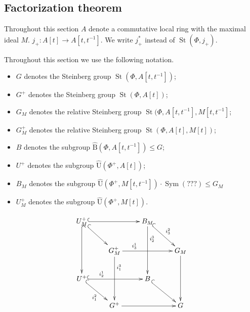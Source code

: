 \documentclass[oneside, 10pt]{amsart}
\DeclareMathOperator{\St}{St}
\DeclareMathOperator{\Sym}{Sym}
\newcommand{\UU}{\hat{\mathrm{U}}}      %
\newcommand{\StB}{\hat{\mathrm{B}}}     %
\numberwithin{equation}{section}
\numberwithin{lemma}{section}
\theoremstyle{definition}
\theoremstyle{remark}
\begin{document}
\subsection{Factorization theorem} 
Throughout this section $A$ denote a commutative local ring with the maximal ideal $M$.
$j_+\colon A[t] \to A[t, t^{-1}]$. We write $j_+^*$ instead of $\St(\Phi, j_+)$.

Throughout this section we use the following notation.
\begin{itemize}
 \item $G$ denotes the Steinberg group $\St(\Phi, A[t, t^{-1}])$;
 \item $G^+$ denotes the Steinberg group $\St(\Phi, A[t])$;
 \item $G_M$ denotes the relative Steinberg group $\St(\Phi, A[t, t^{-1}], M[t, t^{-1}]$;
 \item $G^+_M$ denotes the relative Steinberg group $\St(\Phi, A[t], M[t])$;
 \item $B$ denotes the subgroup $\StB(\Phi, A[t, t^{-1}]) \leq G$;
 \item $U^+$ denotes the subgroup $\UU(\Phi^+, A[t])$;
 \item $B_M$ denotes the subgroup $\UU(\Phi^+, M[t, t^{-1}]) \cdot \Sym(???) \leq G_M$
 \item $U^+_M$ denotes the subgroup $\UU(\Phi^+, M[t])$.
\end{itemize}

\[\xymatrix{
U^+_M \ar@{^{(}->}[rr] \ar@{^{(}->}[dd] \ar@{^{(}->}[rd] &                        & B_M \ar[dd]^(.3){i_2^3} \ar@{^{(}->}[rd]^{i^2_3} &           \\
                                & G^+_M \ar[rr]^(.3){i^1_3} \ar^(.3){i^3_1}[dd] &                   & G_M \ar[dd] \\
U^+ \ar@{^{(}->}[rr]^(.3){i_2^1} \ar@{^{(}->}[rd]_{i_1^2}          &                        & B \ar@{^{(}->}[rd]         &           \\
                                & G^+ \ar[rr]              &                   & G}\]
\end{document}
